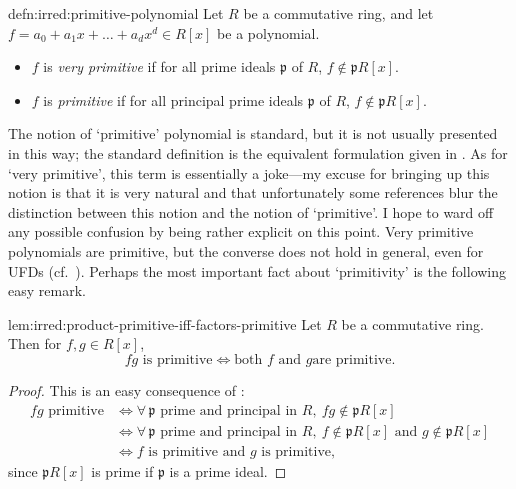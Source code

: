 \begin{defn}{}{defn:irred:primitive-polynomial}
  Let $R$ be a commutative ring, and let
  $f = a_0 + a_1 x + \dots + a_d x^d \in R[x]$ be a polynomial.
  \begin{itemize}
  \item $f$ is \emph{very primitive} if for all prime ideals
    $\mathfrak{p}$ of $R$, $f \notin \mathfrak{p}R[x]$.
  \item $f$ is \emph{primitive} if for all principal prime ideals
    $\mathfrak{p}$ of $R$, $f \notin \mathfrak{p}R[x]$.
  \end{itemize}
\end{defn}
The notion of `primitive' polynomial is standard, but it is not
usually presented in this way; the standard definition is the
equivalent formulation given in . As for `very
primitive', this term is essentially a joke---my excuse for bringing
up this notion is that it is very natural and that unfortunately some
references blur the distinction between this notion and the notion of
`primitive'. I hope to ward off any possible confusion by being rather
explicit on this point. Very primitive polynomials are primitive, but
the converse does not hold in general, even for UFDs (cf.\
).  Perhaps the
most important fact about `primitivity' is the following easy remark.

\begin{lem}{}{lem:irred:product-primitive-iff-factors-primitive}
  Let $R$ be a commutative ring. Then for $f, g \in R[x]$,
  \[fg \text{ is primitive} \iff \text{both } f \text{ and } g \text{
      are primitive.}\]
\end{lem}

\begin{proof}
  This is an easy consequence of :
  \begin{align*}
    fg \text{ primitive}
    &\iff \forall\, \mathfrak{p} \text{ prime and principal in } R,\
      fg \notin \mathfrak{p}R[x] \\
    &\iff \forall\, \mathfrak{p} \text{ prime and principal in } R,\
      f \notin \mathfrak{p}R[x] \text{ and } g \notin \mathfrak{p}R[x] \\
    &\iff f \text{ is primitive and } g \text{ is primitive,}
  \end{align*}
  since $\mathfrak{p}R[x]$ is prime if $\mathfrak{p}$ is a prime
  ideal.
\end{proof}

